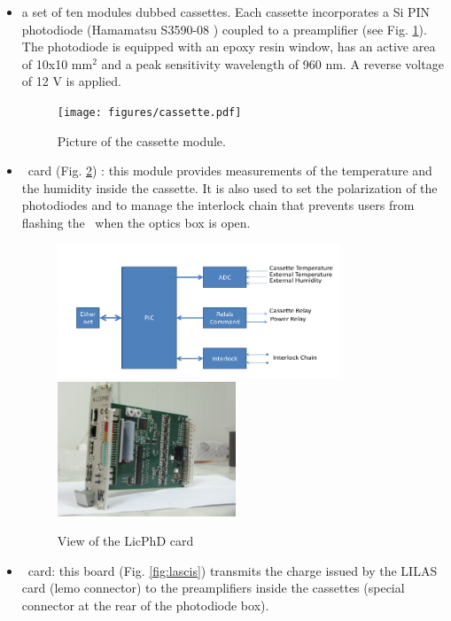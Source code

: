 \begin{itemize}
\item a set of ten modules dubbed cassettes. Each cassette incorporates a Si PIN photodiode (Hamamatsu S3590-08 \cite{ref:photodiode}) coupled to a preamplifier (see Fig. \ref{fig:cassette}). The photodiode is equipped with an epoxy resin window, has an active area of 10x10 mm$^{2}$ and a peak sensitivity wavelength of 960 nm. A reverse voltage of 12 V is applied.

\begin{figure}[htbp]
\centering
\texttt{[image: figures/cassette.pdf]}
\caption{Picture of the cassette module.}\label{fig:cassette}
\end{figure}

\item \licphd~card (Fig. \ref{fig:laslicphd}) : this module provides measurements of  the temperature and the humidity inside the cassette. It is also used to set the polarization of the photodiodes and to
manage the interlock chain that prevents users from flashing the \laser~when the optics box is open.

\begin{figure}[htbp]
\centering
\includegraphics[height=4cm]{figures/licphd_scheme.pdf}
\includegraphics[height=4cm]{figures/licphd.JPG}
\caption{View of the LicPhD card}\label{fig:laslicphd}
\end{figure}

\item \charinjsplit~card: this board (Fig. \ref{fig:lascis}) transmits the charge issued by the LILAS card (lemo connector) to the preamplifiers inside the cassettes (special connector at the rear of the photodiode box). 




\end{itemize}
